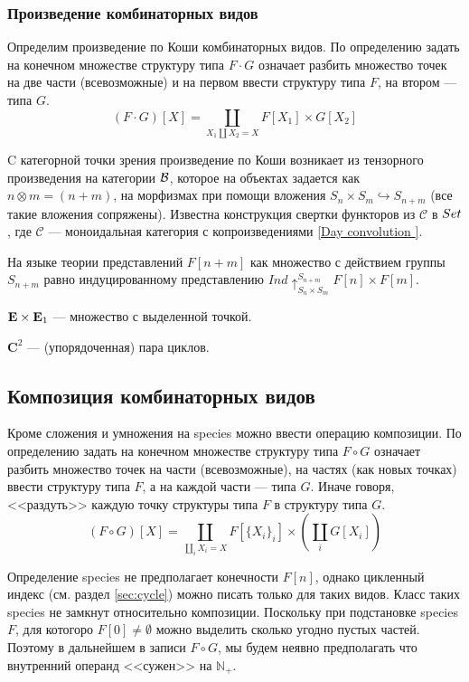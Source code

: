 \subsubsection{Произведение комбинаторных видов} 
Определим произведение по Коши комбинаторных видов. По определению задать на
конечном множестве структуру типа $F \cdot G$ означает разбить множество точек 
на две части (всевозможные) и на первом ввести структуру типа $F$,
на втором --- типа $G$. 
$$(F \cdot G)[X] = \coprod\limits_{X_1 \coprod X_2 =
X}F[X_1] \times G[X_2]$$


C категорной точки зрения произведение по Коши возникает из тензорного
произведения на категории $\mathcal B$, которое на объектах задается как $n \otimes m =
(n + m)$, на морфизмах при помощи вложения $S_n \times S_m \hookrightarrow
S_{n+m}$ (все такие вложения сопряжены).
Известна конструкция свертки функторов из $\mathcal C$ в $Set$, где
$\mathcal C$ --- моноидальная категория с копроизведениями
\href{http://nlab.mathforge.org/nlab/show/Day+convolution}{[Day
convolution \cite{Day}]}.


На языке теории представлений $F[n+m]$ как множество с действием группы
$S_{n+m}$ равно индуцированному представлению $Ind \uparrow_{S_n \times S_m}
^{S_{n+m}} F[n]\times F[m]$.

\begin{example}
$\mathbf E \times \mathbf E_1$ --- множество с выделенной точкой.
\end{example}
\begin{example}
$\mathbf C^2$ --- (упорядоченная) пара циклов.
\end{example}

\subsection{Композиция комбинаторных видов}
Кроме сложения и умножения на species можно ввести операцию композиции.
По определению задать на конечном множестве структуру типа $F \circ G$ означает
разбить множество точек на части (всевозможные), на частях (как новых точках)
ввести структуру типа $F$, а на каждой части --- типа $G$. Иначе говоря, <<раздуть>>
каждую точку структуры типа $F$ в структуру типа $G$.
$$
(F \circ G)[X] =
\coprod\limits_{\coprod\limits_i X_i = X} F[\{X_i\}_i] \times
(\coprod\limits_{i} G[X_i]) 
$$

\begin{remark}
\label{rem:finit}
Определение species не предполагает конечности $F[n]$, однако цикленный индекс
(см. раздел \ref{sec:cycle}) можно писать только для таких видов. Класс таких
species не замкнут относительно композиции. Поскольку при подстановке
species $F$, для котогоро $F[0] \neq \emptyset$ можно выделить сколько угодно пустых
частей. Поэтому в дальнейшем в записи $F \circ G$, мы будем неявно предполагать
что внутренний операнд <<сужен>> на $\mathbb N_{+}$.
\end{remark}

